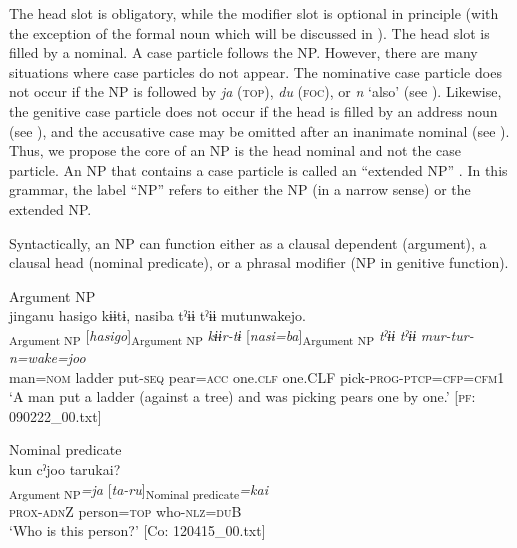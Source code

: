 The head slot is obligatory, while the modifier slot is optional in principle (with the exception of the formal noun which will be discussed in ). The head slot is filled by a nominal. A case particle follows the NP. However, there are many situations where case particles do not appear. The nominative case particle does not occur if the NP is followed by \textit{ja} (\textsc{top}), \textit{du} (\textsc{foc}), or \textit{n} ‘also’ (see ). Likewise, the genitive case particle does not occur if the head is filled by an address noun (see ), and the accusative case may be omitted after an inanimate nominal (see ). Thus, we propose the core of an NP is the head nominal and not the case particle. An NP that contains a case particle is called an “extended NP” \citep[167]{Shimoji2008}. In this grammar, the label “NP” refers to either the NP (in a narrow sense) or the extended NP.

Syntactically, an NP can function either as a clausal dependent (argument), a clausal head (nominal predicate), or a phrasal modifier (NP in genitive function).

\ea\label{ex:4.2}
\ea\label{ex:4.2a}Argument NP\\
\glll      jinganu  {\textbar}hasigo{\textbar}  kɨɨtɨ,  nasiba   tˀɨɨ  tˀɨɨ  mutunwakejo.\\
      [\textit{jinga=nu}]\textsubscript{Argument NP}  [\textit{hasigo}]\textsubscript{Argument NP}  \textit{kɨɨr-tɨ}  [\textit{nasi=ba}]\textsubscript{Argument NP}         \textit{tˀɨɨ}  \textit{tˀɨɨ}  \textit{mur-tur-n=wake=joo}\\
      man=\textsc{nom}  ladder  put-\textsc{seq}  pear=\textsc{acc}      one.\textsc{clf}  one.CLF  pick-\textsc{prog}-\textsc{ptcp}=\textsc{cfp}=\textsc{cfm}1     \\
      \glt       ‘A man put a ladder (against a tree) and was picking pears one by one.’ [\textsc{pf}: 090222\_00.txt]

\ex\label{ex:4.2b}Nominal predicate\\
\glll     kun  cˀjoo  tarukai?\\
      [\textit{ku-n}  \textit{cˀju}]\textsubscript{Argument NP}\textit{=ja}  [\textit{ta-ru}]\textsubscript{Nominal predicate}\textit{=kai}\\
      \textsc{prox}-\textsc{adn}Z  person=\textsc{top}  who-\textsc{nlz}=\textsc{du}B\\
      \glt       ‘Who is this person?’ [Co: 120415\_00.txt]

